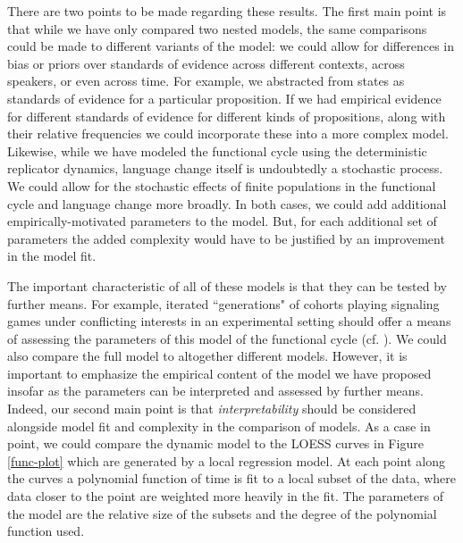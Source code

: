 \documentclass[linguex]{sp}
\theoremstyle{definition} \newtheorem{definition}{Definition}
\begin{document}
There are two points to be made regarding these results. The first main point is that while we have only compared two nested models, the same comparisons could be made to different variants of the model: we could allow for differences in bias or priors over standards of evidence across different contexts, across speakers, or even across time. For example, we abstracted from states as standards of evidence for a particular proposition. If we had empirical evidence for different standards of evidence for different kinds of propositions, along with their relative frequencies we could incorporate these into a more complex model. Likewise, while we have modeled the functional cycle using the deterministic replicator dynamics, language change itself is undoubtedly a stochastic process.  We could allow for the stochastic effects of finite populations \citep{moran1958,kimura1955a, kimura1955b, kimura1968} in the functional cycle and language  change more broadly. In both cases, we could add additional empirically-motivated parameters to the model. But, for each additional set of parameters the added complexity would have to be justified by an improvement in the model fit. 

The important characteristic of all of these models is that they can be tested by further means. For example, iterated ``generations" of cohorts playing signaling games under conflicting interests in an experimental setting should offer a means of assessing the parameters of this model of the functional cycle  (cf. \citealt{blume-etal:2001,mesoudi2008multiple}).  We could also compare the full model to altogether different models. However, it is important to emphasize the empirical content of the model we have proposed insofar as the parameters can be interpreted and assessed by further means.  Indeed, our second main point is that \emph{interpretability} should be considered alongside model fit and complexity in the comparison of models. As a case in point, we could compare the dynamic model to the LOESS curves in Figure \ref{func-plot} which are generated by a local regression model. At each point along the curves a polynomial function of time is fit to a local subset of the data, where data closer to the point are weighted more heavily in the fit. The parameters of the model are the relative size of the subsets and the degree of the polynomial function used. 
\end{document}
